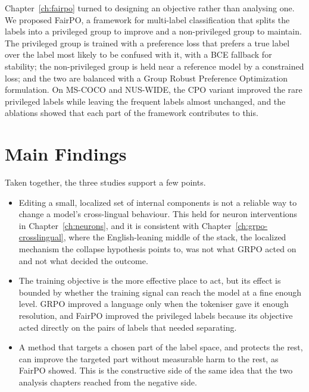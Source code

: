 Chapter~\ref{ch:fairpo} turned to designing an objective rather than analysing one.
We proposed FairPO, a framework for multi-label classification that splits the labels
into a privileged group to improve and a non-privileged group to maintain. The
privileged group is trained with a preference loss that prefers a true label over the
label most likely to be confused with it, with a BCE fallback for stability; the
non-privileged group is held near a reference model by a constrained loss; and the
two are balanced with a Group Robust Preference Optimization formulation. On MS-COCO
and NUS-WIDE, the CPO variant improved the rare privileged labels while leaving the
frequent labels almost unchanged, and the ablations showed that each part of the
framework contributes to this.

\section{Main Findings}
\label{sec:conclusion-findings}

Taken together, the three studies support a few points.

\begin{itemize}
	\item Editing a small, localized set of internal components is not a reliable way
	to change a model's cross-lingual behaviour. This held for neuron interventions
	in Chapter~\ref{ch:neurons}, and it is consistent with
	Chapter~\ref{ch:grpo-crosslingual}, where the English-leaning middle of the
	stack, the localized mechanism the collapse hypothesis points to, was not what
	GRPO acted on and not what decided the outcome.
	
	\item The training objective is the more effective place to act, but its effect
	is bounded by whether the training signal can reach the model at a fine enough
	level. GRPO improved a language only when the tokeniser gave it enough
	resolution, and FairPO improved the privileged labels because its objective acted
	directly on the pairs of labels that needed separating.
	
	\item A method that targets a chosen part of the label space, and protects the
	rest, can improve the targeted part without measurable harm to the rest, as
	FairPO showed. This is the constructive side of the same idea that the two
	analysis chapters reached from the negative side.
\end{itemize}

